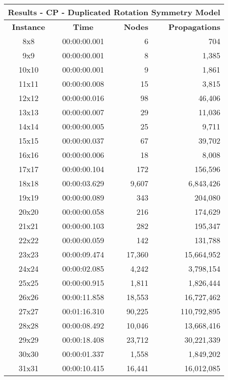 
\begin{center}
    \begin{tabular}{|c|c|r|r|}
        \hline
        \multicolumn{4}{|c|}{\textbf{Results - CP - Duplicated Rotation Symmetry Model}} \\
        \hline
        \textbf{Instance} & \textbf{Time} & \textbf{Nodes} & \textbf{Propagations} \\
        
        \hline
		8x8 & 00:00:00.001 & 6 & 704 \\ \hline
		9x9 & 00:00:00.001 & 8 & 1,385 \\ \hline
		10x10 & 00:00:00.001 & 9 & 1,861 \\ \hline
		11x11 & 00:00:00.008 & 15 & 3,815 \\ \hline
		12x12 & 00:00:00.016 & 98 & 46,406 \\ \hline
		13x13 & 00:00:00.007 & 29 & 11,036 \\ \hline
		14x14 & 00:00:00.005 & 25 & 9,711 \\ \hline
		15x15 & 00:00:00.037 & 67 & 39,702 \\ \hline
		16x16 & 00:00:00.006 & 18 & 8,008 \\ \hline
		17x17 & 00:00:00.104 & 172 & 156,596 \\ \hline
		18x18 & 00:00:03.629 & 9,607 & 6,843,426 \\ \hline
		19x19 & 00:00:00.089 & 343 & 204,080 \\ \hline
		20x20 & 00:00:00.058 & 216 & 174,629 \\ \hline
		21x21 & 00:00:00.103 & 282 & 195,347 \\ \hline
		22x22 & 00:00:00.059 & 142 & 131,788 \\ \hline
		23x23 & 00:00:09.474 & 17,360 & 15,664,952 \\ \hline
		24x24 & 00:00:02.085 & 4,242 & 3,798,154 \\ \hline
		25x25 & 00:00:00.915 & 1,811 & 1,826,444 \\ \hline
		26x26 & 00:00:11.858 & 18,553 & 16,727,462 \\ \hline
		27x27 & 00:01:16.310 & 90,225 & 110,792,895 \\ \hline
		28x28 & 00:00:08.492 & 10,046 & 13,668,416 \\ \hline
		29x29 & 00:00:18.408 & 23,712 & 30,221,339 \\ \hline
		30x30 & 00:00:01.337 & 1,558 & 1,849,202 \\ \hline
		31x31 & 00:00:10.415 & 16,441 & 16,012,085 \\ \hline

\end{tabular}
\end{center}
